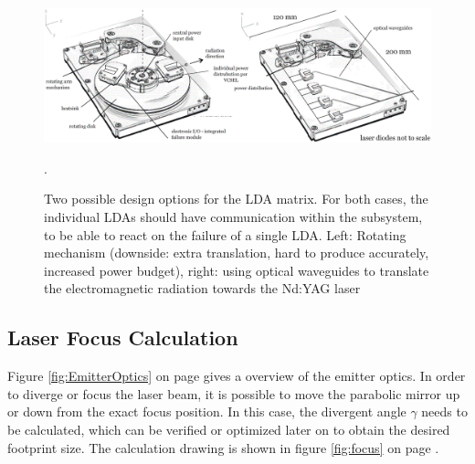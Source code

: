 \begin{figure}[ht!]
\centering
\includegraphics[scale=0.4]{chapters/img/Diode_laser.png} 
\caption[Two possible design options for the \acs{LDA} matrix]{Two possible design options for the \acs{LDA} matrix. For both cases, the individual \acp{LDA} should have communication within the subsystem, to be able to react on the failure of a single \acs{LDA}. Left: Rotating mechanism (downside: extra translation, hard to produce accurately, increased power budget), right: using optical waveguides to translate the electromagnetic radiation towards the Nd:YAG \acs{laser}}.
\label{fig:laser_design_option}
\end{figure}


\subsection{Laser Focus Calculation}
\label{focus}
Figure \ref{fig:EmitterOptics} on page \pageref{fig:EmitterOptics} gives a overview of the emitter optics. In order to diverge or focus the laser beam, it is possible to move the parabolic mirror up or down from the exact focus position. In this case, the divergent angle $\gamma$ needs to be calculated, which can be verified or optimized later on to obtain the desired footprint size. The calculation drawing is shown in figure \ref{fig:focus} on page \pageref{fig:focus}.

